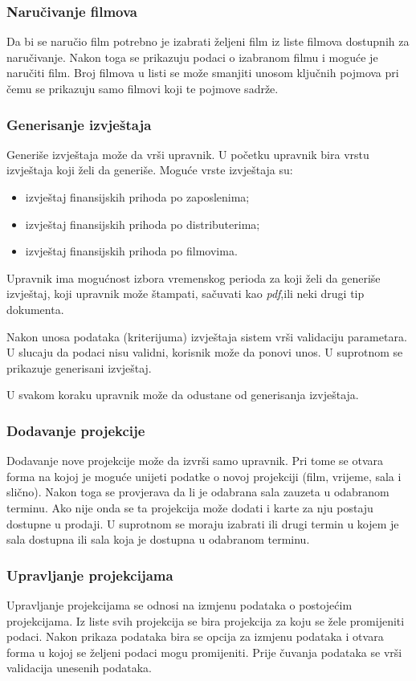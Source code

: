 \subsubsection{Naručivanje filmova}

Da bi se naručio film potrebno je izabrati željeni film iz liste filmova dostupnih za naručivanje. Nakon toga se prikazuju podaci o 
izabranom filmu i moguće je naručiti film. Broj filmova u listi se može smanjiti unosom ključnih pojmova pri čemu se prikazuju samo 
filmovi koji te pojmove sadrže.

\subsubsection{Generisanje izvještaja}
Generiše izvještaja može da vrši upravnik. U početku upravnik bira vrstu izvještaja koji želi da generiše. Moguće vrste izvještaja su: 
\begin{itemize}
\item izvještaj finansijskih prihoda po zaposlenima;
\item izvještaj finansijskih prihoda po distributerima;
\item izvještaj finansijskih prihoda po filmovima.
\end{itemize}
Upravnik ima mogućnost izbora vremenskog perioda za koji želi da generiše izvještaj, koji upravnik može štampati, sačuvati kao \textit{pdf},ili neki drugi tip dokumenta.

Nakon unosa podataka (kriterijuma) izvještaja sistem vrši validaciju parametara. U slucaju da podaci nisu validni, korisnik može da ponovi unos. U suprotnom se prikazuje generisani izvještaj.

U svakom koraku upravnik može da odustane od generisanja izvještaja.



\subsubsection{Dodavanje projekcije}
Dodavanje nove projekcije može da izvrši samo upravnik. Pri tome se otvara forma na kojoj je moguće unijeti podatke o novoj 
projekciji (film, vrijeme, sala i slično). Nakon toga se provjerava da li je odabrana 
sala zauzeta u odabranom terminu. Ako nije onda se ta projekcija može dodati i karte za nju postaju dostupne u prodaji. U suprotnom 
se moraju izabrati ili drugi termin u kojem je sala dostupna ili sala koja je dostupna u odabranom terminu.

\subsubsection{Upravljanje projekcijama}
Upravljanje projekcijama se odnosi na izmjenu podataka o postojećim projekcijama. Iz liste svih projekcija se bira projekcija 
za koju se žele promijeniti podaci. Nakon prikaza podataka bira se opcija za izmjenu podataka i otvara forma u kojoj se 
željeni podaci mogu promijeniti. Prije čuvanja podataka se vrši validacija unesenih podataka.


